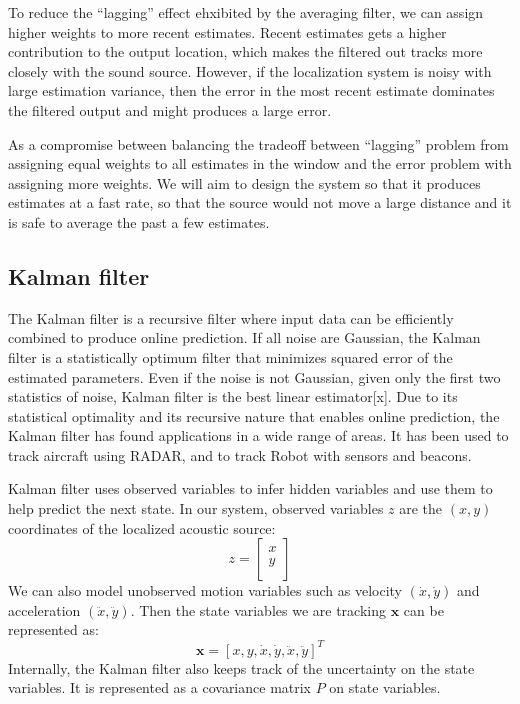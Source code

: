 To reduce the ``lagging'' effect ehxibited by the averaging filter, we can assign higher weights to more recent estimates. Recent estimates gets a higher contribution to the output location, which makes the filtered out tracks more closely with the sound source. However, if the localization system is noisy with large estimation variance, then the error in the most recent estimate dominates the filtered output and might produces a large error.

As a compromise between balancing the tradeoff between ``lagging'' problem from assigning equal weights to all estimates in the window and the error problem with assigning more weights. We will aim to design the system so that it produces estimates at a fast rate, so that the source would not move a large distance and it is safe to average the past a few estimates.

\subsection{Kalman filter}
The Kalman filter is a recursive filter where input data can be efficiently combined to produce online prediction. If all noise are Gaussian, the Kalman filter is a statistically optimum filter that minimizes squared error of the estimated parameters. Even if the noise is not Gaussian, given only the first two statistics of noise, Kalman filter is the best linear estimator[x]. Due to its statistical optimality and its recursive nature that enables online prediction, the Kalman filter has found applications in a wide range of areas. It has been used to track aircraft using RADAR, and to track Robot with sensors and beacons.

Kalman filter uses observed variables to infer hidden variables and use them to help predict the next state. In our system, observed variables $z$ are the $(x,y)$ coordinates of the localized acoustic source:
\[
z = \left[\begin{array}{c}
x\\
y\\
\end{array}\right]
\]
We can also model unobserved motion variables such as velocity $(\dot{x}, \dot{y})$ and acceleration $(\ddot{x}, \ddot{y})$. Then the state variables we are tracking $\mathbf{x}$ can be represented as:
\[
\mathbf{x} = \left[x, y, \dot{x}, \dot{y}, \ddot{x}, \ddot{y}\right]^T
\]
Internally, the Kalman filter also keeps track of the uncertainty on the state variables. It is represented as a covariance matrix $P$ on state variables.

